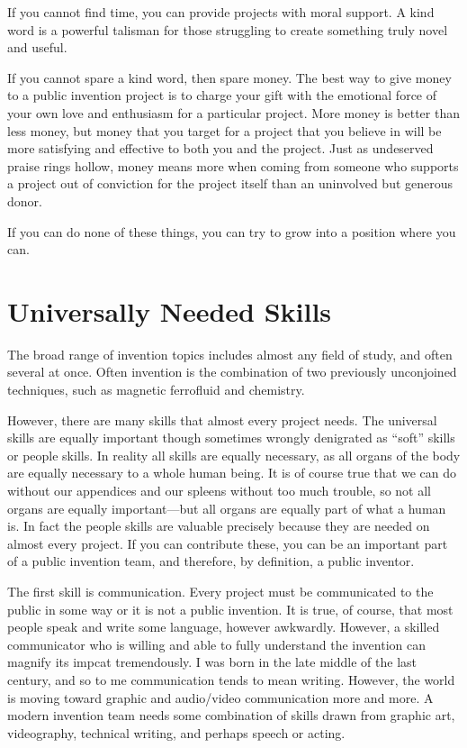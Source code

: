 \documentclass[
	fontsize=10pt, %
	twoside=false, %
	secnumdepth=1, %
]{kaobook}
\begin{document}
If you cannot find time, you can provide projects with moral support.
A kind word is a powerful talisman for those struggling
to create something truly novel and useful.

If you cannot spare a kind word, then spare money.
The best way to give money to a public invention project is
to charge your gift with the emotional force of your own
love and enthusiasm for a particular project.
More money is better than less money, but money that
you target for a project that you believe in will be
more satisfying and effective to both you and the project.
Just as undeserved praise rings hollow,
money means more when coming from someone who
supports a project out of conviction for
the project itself than an uninvolved but generous donor.

If you can do none of these things, you can try
to grow into a position where you can.

\section{Universally Needed Skills}

\label{sec:universallyneeded}

The broad range of invention topics includes almost any field of study, and
often several at once.
Often invention is the combination of two previously unconjoined techniques,
such as magnetic ferrofluid and chemistry.

However, there are many skills that almost every project needs.
The universal skills are equally important though sometimes wrongly denigrated as ``soft'' skills
or people skills.
In reality all skills are equally necessary, as all organs of the body are equally necessary to
a whole human being.
It is of course true that we can do without our appendices and our spleens without too much trouble,
so not all organs are equally important---but all organs are equally part of what a human is.
In fact the people skills are valuable precisely because they are needed on almost every project.
If you can contribute these, you can be an important part of a public invention team, and therefore,
by definition, a public inventor.

The first skill is communication. Every project must be communicated to the public in some way
or it is not a public invention. It is true, of course, that most people speak and write some language,
however awkwardly. However, a skilled communicator who is willing and able to fully understand the
invention can magnify its impcat tremendously.
I was born in the late middle of the last century, and so to me communication tends to mean writing.
However, the world is moving toward graphic and audio/video communication more and more.
A modern invention team needs some combination of skills drawn from graphic art, videography,
technical writing, and perhaps speech or acting.
\end{document}

